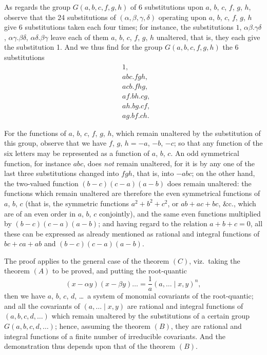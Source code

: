 \documentclass[11pt,a4paper,english]{article}
\theoremstyle{plain}
\begin{document}
As regards the group $G(a, b, c, f, g, h)$ of 6 substitutions upon $a$, $b$, $c$, $f$, $g$, $h$, observe that the 24 substitutions of $(\alpha, \beta, \gamma, \delta)$ operating upon $a$, $b$, $c$, $f$, $g$, $h$ give 6 substitutions taken each four times; for instance, the substitutions $1$, $\alpha\beta.\gamma\delta$, $\alpha\gamma.\beta\delta$, $\alpha\delta.\beta\gamma$ leave each of them $a$, $b$, $c$, $f$, $g$, $h$ unaltered, that is, they each give the substitution 1. And we thus find for the group $G(a, b, c, f, g, h)$ the 6 substitutions
\begin{align*}
&1,\\
&abc.fgh,\\
&acb.fhg,\\
&af.bh.cg,\\
&ah.bg.cf,\\
&ag.bf.ch.
\end{align*}

For the functions of $a$, $b$, $c$, $f$, $g$, $h$, which remain unaltered by the substitution of this group, observe that we have $f$, $g$, $h = -a$, $-b$, $-c$; so that any function of the six letters may be represented as a function of $a$, $b$, $c$. An odd symmetrical function, for instance $abc$, does \textit{not} remain unaltered, for it is by any one of the last three substitutions changed into $fgh$, that is, into $-abc$; on the other hand, the two-valued function $(b-c)(c-a)(a-b)$ does remain unaltered: the functions which remain unaltered are therefore the even symmetrical functions of $a$, $b$, $c$ (that is, the symmetric functions $a^2 + b^2 + c^2$, or $ab + ac + bc$, \&c., which are of an even order in $a$, $b$, $c$ conjointly), and the same even functions multiplied by $(b-c)(c-a)(a-b)$; and having regard to the relation $a + b + c = 0$, all these can be expressed as already mentioned as rational and integral functions of $bc + ca + ab$ and $(b-c)(c-a)(a-b)$.

The proof applies to the general case of the theorem $(C)$, viz.\ taking the theorem $(A)$ to be proved, and putting the root-quantic
\[
(x - \alpha y)(x - \beta y) \ldots = \frac{1}{a}(a, \ldots \mid x, y)^n,
\]
then we have $a$, $b$, $c$, $d$, \ldots\ a system of monomial covariants of the root-quantic; and all the covariants of $(a, \ldots \mid x, y)$ are rational and integral functions of $(a, b, c, d, \ldots)$ which remain unaltered by the substitutions of a certain group $G(a, b, c, d, \ldots)$; hence, assuming the theorem $(B)$, they are rational and integral functions of a finite number of irreducible covariants. And the demonstration thus depends upon that of the theorem $(B)$.
\end{document}
